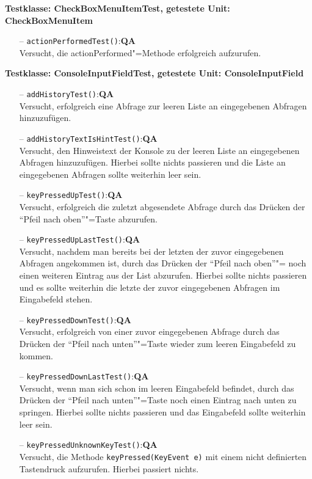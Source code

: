 \documentclass[parskip=full,11pt,twoside]{scrartcl}
\def\qa{\hfill\textbf{QA}}
\begin{document}
\textbf{Testklasse: CheckBoxMenuItemTest, getestete Unit: CheckBoxMenuItem}
\begin{itemize}
	\item[--] \texttt{actionPerformedTest()}:\qa\\
	Versucht, die actionPerformed"=Methode erfolgreich aufzurufen.
\end{itemize}

\textbf{Testklasse: ConsoleInputFieldTest, getestete Unit: ConsoleInputField}
\begin{itemize}
	\item[--] \texttt{addHistoryTest()}:\qa\\
	Versucht, erfolgreich eine Abfrage zur leeren Liste an eingegebenen Abfragen hinzuzufügen.
	\item[--] \texttt{addHistoryTextIsHintTest()}:\qa\\
	Versucht, den Hinweistext der Konsole zu der leeren Liste an eingegebenen Abfragen hinzuzufügen. Hierbei sollte nichts passieren und die Liste an eingegebenen Abfragen sollte weiterhin leer sein.
	\item[--] \texttt{keyPressedUpTest()}:\qa\\
	Versucht, erfolgreich die zuletzt abgesendete Abfrage durch das Drücken der \enquote{Pfeil nach oben}"=Taste abzurufen.
	\item[--] \texttt{keyPressedUpLastTest()}:\qa\\
	Versucht, nachdem man bereits bei der letzten der zuvor eingegebenen Abfragen angekommen ist, durch das Drücken der \enquote{Pfeil nach oben}"= noch einen weiteren Eintrag aus der List abzurufen. Hierbei sollte nichts passieren und es sollte weiterhin die letzte der zuvor eingegebenen Abfragen im Eingabefeld stehen.
	\item[--] \texttt{keyPressedDownTest()}:\qa\\
	Versucht, erfolgreich von einer zuvor eingegebenen Abfrage durch das Drücken der \enquote{Pfeil nach unten}"=Taste wieder zum leeren Eingabefeld zu kommen.
	\item[--] \texttt{keyPressedDownLastTest()}:\qa\\
	Versucht, wenn man sich schon im leeren Eingabefeld befindet, durch das Drücken der \enquote{Pfeil nach unten}"=Taste noch einen Eintrag nach unten zu springen. Hierbei sollte nichts passieren und das Eingabefeld sollte weiterhin leer sein.
	\item[--] \texttt{keyPressedUnknownKeyTest()}:\qa\\
	Versucht, die Methode \texttt{keyPressed(KeyEvent e)} mit einem nicht definierten Tastendruck aufzurufen. Hierbei passiert nichts.

\end{itemize}
\end{document}
